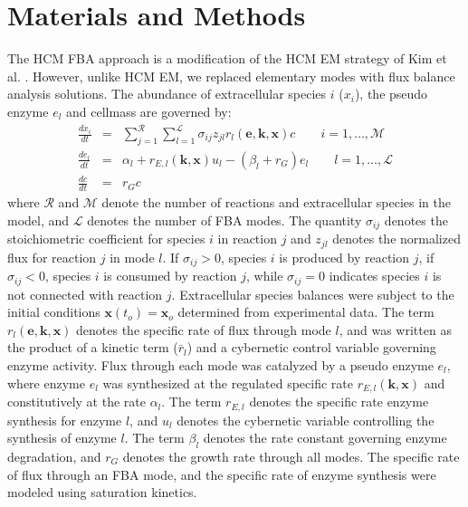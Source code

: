 \documentclass[10pt,twocolumn,twoside,final]{IEEEtran}
\begin{document}
\section{Materials and Methods}
The HCM FBA approach is a modification of the HCM EM strategy of Kim et al. \cite{2008_kim_varner_ramkrishna_BiotechProg}. However, unlike HCM EM, we replaced elementary modes with flux balance analysis solutions. The abundance of extracellular species $i$ ($x_{i}$), the pseudo enzyme $e_{l}$ and cellmass are governed by:
\begin{eqnarray}\nonumber
	\frac{dx_{i}}{dt}  & = &  \sum_{j = 1}^{\mathcal{R}}\sum_{l = 1}^{\mathcal{L}}\sigma_{ij}z_{jl}r_{l}\left(\mathbf{e},\mathbf{k},\mathbf{x}\right)c \qquad{i=1,\hdots,\mathcal{M}}\\\nonumber
  \frac{de_{l}}{dt}  & = & \alpha_{l} + r_{E,l}\left(\mathbf{k},\mathbf{x}\right)u_{l} - \left(\beta_{l}+r_{G}\right)e_{l} \qquad l=1,\hdots,\mathcal{L} \\\nonumber
  \frac{dc}{dt} & = & r_{G}c
\end{eqnarray}
where $\mathcal{R}$ and $\mathcal{M}$ denote the number of reactions and extracellular species in the model, and $\mathcal{L}$ denotes the number of FBA modes.
The quantity $\sigma_{ij}$ denotes the stoichiometric coefficient for species $i$ in reaction $j$ and $z_{jl}$ denotes the normalized flux for reaction $j$ in mode $l$.
If $\sigma_{ij}>0$, species $i$ is produced by reaction $j$,
if $\sigma_{ij}<0$, species $i$ is consumed by reaction $j$, while $\sigma_{ij} = 0$ indicates species $i$ is not connected with reaction $j$.
Extracellular species balances were subject to the initial conditions $\mathbf{x}\left(t_{o}\right) = \mathbf{x}_{o}$ determined from experimental data.
The term $r_{l}\left(\mathbf{e},\mathbf{k},\mathbf{x}\right)$ denotes the specific rate of flux through mode $l$, and was written as the product of a kinetic term ($\bar{r}_{l}$) and a cybernetic control variable governing enzyme activity. Flux through each mode was catalyzed by a pseudo enzyme $e_{l}$, where enzyme $e_{l}$ was synthesized at the regulated specific rate $r_{E,l}\left(\mathbf{k},\mathbf{x}\right)$ and constitutively at the rate $\alpha_{l}$. The term $r_{E,l}$ denotes the specific rate enzyme synthesis for enzyme $l$, and $u_{l}$ denotes the cybernetic variable controlling the synthesis of enzyme $l$. The term $\beta_{l}$ denotes the rate constant governing enzyme degradation, and $r_{G}$ denotes the growth rate through all modes.
The specific rate of flux through an FBA mode, and the specific rate of enzyme synthesis were modeled using saturation kinetics.
\end{document}
